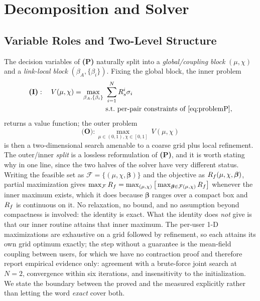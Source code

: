 \section{Decomposition and Solver}\label{sec:decomposition}

\subsection{Variable Roles and Two-Level Structure}

The decision variables of \textbf{(P)} naturally split into a \emph{global/coupling block} $(\mu, \chi)$ and a \emph{link-local block} $(\beta_A, \{\beta_i\})$. Fixing the global block, the inner problem
\begin{equation}\label{eq:innerI}
\begin{aligned}
\textbf{(I)}:\quad V(\mu,\chi) = \max_{\beta_A, \{\beta_i\}}\ & \sum_{i=1}^N R_s^i \sigma_i\\[-1pt]
&\text{s.t.\ per-pair constraints of \eqref{eq:problemP}},
\end{aligned}
\end{equation}
returns a value function; the outer problem
\begin{equation}\label{eq:outerO}
\textbf{(O)}: \max_{\mu\in(0,1),\chi\in[0,1]}\ V(\mu,\chi)
\end{equation}
is then a two-dimensional search amenable to a coarse grid plus local refinement. The outer/inner \emph{split} is a lossless reformulation of \textbf{(P)}, and it is worth stating why in one line, since the two halves of the solver have very different status. Writing the feasible set as $\mathcal{F}=\{(\mu,\chi,\boldsymbol{\beta})\}$ and the objective as $R_f(\mu,\chi,\boldsymbol{\beta})$, partial maximization gives $\max_{\mathcal{F}}R_f = \max_{(\mu,\chi)}\big[\max_{\boldsymbol{\beta}\in\mathcal{F}(\mu,\chi)}R_f\big]$ whenever the inner maximum exists, which it does because $\boldsymbol{\beta}$ ranges over a compact box and $R_f$ is continuous on it. No relaxation, no bound, and no assumption beyond compactness is involved: the identity is exact. What the identity does \emph{not} give is that our inner routine attains that inner maximum. The per-user 1-D maximizations are exhaustive on a grid followed by refinement, so each attains its own grid optimum exactly; the step without a guarantee is the mean-field coupling between users, for which we have no contraction proof and therefore report empirical evidence only: agreement with a brute-force joint search at $N{=}2$, convergence within six iterations, and insensitivity to the initialization. We state the boundary between the proved and the measured explicitly rather than letting the word \emph{exact} cover both.


